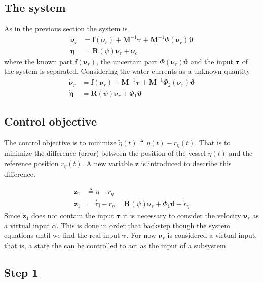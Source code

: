 \documentclass[12pt,a4]{article}
\begin{document}
\subsection{The system}
As in the previous section the system is
\begin{align}
	\bm{\dot{\nu}}_r & = \bm{f}(\bm{\nu}_r) + \bm{M}^{-1}\bm{\tau} + \bm{M}^{-1}\Phi(\bm{\nu}_r )\bm{\vartheta} \\
	\bm{\dot{\eta}}  & = \bm{R}(\psi)\bm{\nu}_r + \bm{\nu}_c
\end{align}
where the known part $\bm{f}(\bm{\nu}_r)$, the uncertain part $\Phi(\bm{\nu}_r )\bm{\vartheta}$ and the input $\bm{\tau}$
of the system is separated. Considering the water currents as a unknown quantity
\begin{align}
	\bm{\dot{\nu}}_r & = \bm{f}(\bm{\nu}_r) + \bm{M}^{-1}\bm{\tau} + \bm{M}^{-1}\Phi_2 (\bm{\nu}_r )\bm{\vartheta} \\
	\bm{\dot{\eta}}  & = \bm{R}(\psi)\bm{\nu}_r + \Phi_1\bm{\vartheta}
\end{align}

\subsection{Control objective}
The control objective is to minimize $\tilde{\eta}(t) \triangleq \eta(t) - r_{\eta}(t)$.
That is to minimize the difference (error) between the position of the vessel $\eta(t)$ and the reference position $r_{\eta}(t)$.
A new variable $\bm{z}$ is introduced to describe this difference.

\begin{align}
	\bm{z}_1       & \triangleq \eta - r_{\eta}                                                                          \\
	\bm{\dot{z}}_1 & = \bm{\dot{\eta}} - \dot{r}_{\eta} = \bm{R}(\psi)\bm{\nu}_r + \Phi_1\bm{\vartheta} - \dot{r}_{\eta}
\end{align}
Since $\bm{\dot{z}}_1 $ does not contain the input $\bm{\tau}$ it is necessary to consider the velocity $\bm{\nu}_r $ as a virtual input $\alpha$.
This is done in order that backstep though the system equations until we find the real input $\bm{\tau}$. For now $\bm{\nu}_r $ is considered a virtual input,
that is, a state the can be controlled to act as the input of a subsystem.

\subsection{Step 1}
\end{document}
